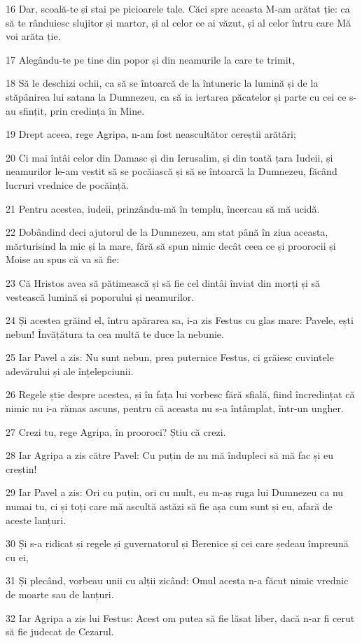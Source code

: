 \par 16 Dar, scoală-te și stai pe picioarele tale. Căci spre aceasta M-am arătat ție: ca să te rânduiesc slujitor și martor, și al celor ce ai văzut, și al celor întru care Mă voi arăta ție.
\par 17 Alegându-te pe tine din popor și din neamurile la care te trimit,
\par 18 Să le deschizi ochii, ca să se întoarcă de la întuneric la lumină și de la stăpânirea lui satana la Dumnezeu, ca să ia iertarea păcatelor și parte cu cei ce s-au sfințit, prin credința în Mine.
\par 19 Drept aceea, rege Agripa, n-am fost neascultător cereștii arătări;
\par 20 Ci mai întâi celor din Damasc și din Ierusalim, și din toată țara Iudeii, și neamurilor le-am vestit să se pocăiască și să se întoarcă la Dumnezeu, făcând lucruri vrednice de pocăință.
\par 21 Pentru acestea, iudeii, prinzându-mă în templu, încercau să mă ucidă.
\par 22 Dobândind deci ajutorul de la Dumnezeu, am stat până în ziua aceasta, mărturisind la mic și la mare, fără să spun nimic decât ceea ce și proorocii și Moise au spus că va să fie:
\par 23 Că Hristos avea să pătimească și să fie cel dintâi înviat din morți și să vestească lumină și poporului și neamurilor.
\par 24 Și acestea grăind el, întru apărarea sa, i-a zis Festus cu glas mare: Pavele, ești nebun! Învățătura ta cea multă te duce la nebunie.
\par 25 Iar Pavel a zis: Nu sunt nebun, prea puternice Festus, ci grăiesc cuvintele adevărului și ale înțelepciunii.
\par 26 Regele știe despre acestea, și în fața lui vorbesc fără sfială, fiind încredințat că nimic nu i-a rămas ascuns, pentru că aceasta nu s-a întâmplat, într-un ungher.
\par 27 Crezi tu, rege Agripa, în prooroci? Știu că crezi.
\par 28 Iar Agripa a zis către Pavel: Cu puțin de nu mă îndupleci să mă fac și eu creștin!
\par 29 Iar Pavel a zis: Ori cu puțin, ori cu mult, eu m-aș ruga lui Dumnezeu ca nu numai tu, ci și toți care mă ascultă astăzi să fie așa cum sunt și eu, afară de aceste lanțuri.
\par 30 Și s-a ridicat și regele și guvernatorul și Berenice și cei care ședeau împreună cu ei,
\par 31 Și plecând, vorbeau unii cu alții zicând: Omul acesta n-a făcut nimic vrednic de moarte sau de lanțuri.
\par 32 Iar Agripa a zis lui Festus: Acest om putea să fie lăsat liber, dacă n-ar fi cerut să fie judecat de Cezarul.

